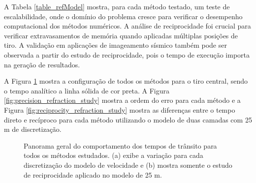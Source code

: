 A Tabela \ref{table_refModel} mostra, para cada método testado, um teste de escalabilidade, onde o domínio do problema cresce para verificar o desempenho computacional dos métodos numéricos. A análise de reciprocidade foi crucial para verificar extravasamentos de memória quando aplicadas múltiplas posições de tiro. A validação em aplicações de imageamento sísmico também pode ser observada a partir do estudo de reciprocidade, pois o tempo de execução importa na geração de resultados. 

A Figura \ref{fig:general_refraction_study} mostra a configuração de todos os métodos para o tiro central, sendo o tempo analítico a linha sólida de cor preta. A Figura \ref{fig:precision_refraction_study} mostra a ordem do erro para cada método e a Figura \ref{fig:reciprocity_refraction_study} mostra as diferenças entre o tempo direto e recíproco para cada método utilizando o modelo de duas camadas com 25 m de discretização.  

\begin{figure}[H]
	\centering
	\newline
	\caption{Panorama geral do comportamento dos tempos de trânsito para todos os métodos estudados. (a) exibe a variação para cada discretização do modelo de velocidade e (b) mostra somente o estudo de reciprocidade aplicado no modelo de 25 m.}
	\label{fig:general_refraction_study}	
\end{figure}

